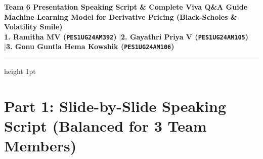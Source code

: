 \documentclass[10pt]{article}
\begin{document}
\sffamily

\begin{center}
    {\LARGE\bfseries\color{navy} Team 6 Presentation Speaking Script \& Complete Viva Q\&A Guide}\\[0.18cm]
    {\large\bfseries Machine Learning Model for Derivative Pricing (Black-Scholes \& Volatility Smile)}\\[0.15cm]
    {\small\textbf{1. Ramitha MV (\texttt{PES1UG24AM392})} \quad|\quad \textbf{2. Gayathri Priya V (\texttt{PES1UG24AM105})} \quad|\quad \textbf{3. Gonu Guntla Hema Kowshik (\texttt{PES1UG24AM106})}}
\end{center}
\hrule height 1pt
\vspace{0.18cm}

\section*{\color{royal}Part 1: Slide-by-Slide Speaking Script (Balanced for 3 Team Members)}
\end{document}

